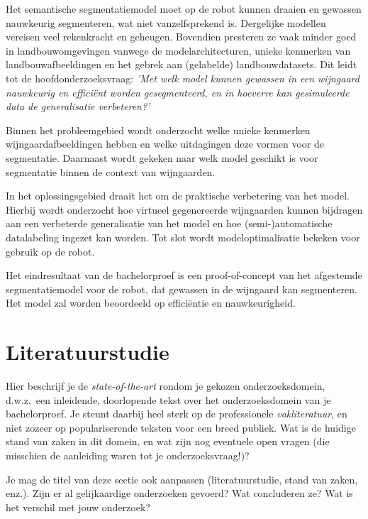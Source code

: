 Het semantische segmentatiemodel moet op de robot kunnen draaien en gewassen nauwkeurig segmenteren, wat niet vanzelfsprekend is. Dergelijke modellen vereisen veel rekenkracht en geheugen. Bovendien presteren ze vaak minder goed in landbouwomgevingen vanwege de modelarchitecturen, unieke kenmerken van landbouwafbeeldingen en het gebrek aan (gelabelde) landbouwdatasets. Dit leidt tot de hoofdonderzoeksvraag: \emph{'Met welk model kunnen gewassen in een wijngaard nauwkeurig en efficiënt worden gesegmenteerd, en in hoeverre kan gesimuleerde data de generalisatie verbeteren?'}

Binnen het probleemgebied wordt onderzocht welke unieke kenmerken wijngaardafbeeldingen hebben en welke uitdagingen deze vormen voor de segmentatie. Daarnaast wordt gekeken naar welk model geschikt is voor segmentatie binnen de context van wijngaarden.

In het oplossingsgebied draait het om de praktische verbetering van het model. Hierbij wordt onderzocht hoe virtueel gegenereerde wijngaarden kunnen bijdragen aan een verbeterde generalisatie van het model en hoe (semi-)automatische datalabeling ingezet kan worden.  Tot slot wordt modeloptimalisatie bekeken voor gebruik op de robot.

Het eindresultaat van de bachelorproef is een proof-of-concept van het afgestemde segmentatiemodel voor de robot, dat gewassen in de wijngaard kan segmenteren. Het model zal worden beoordeeld op efficiëntie en nauwkeurigheid.


\section{Literatuurstudie}%
\label{sec:literatuurstudie}

Hier beschrijf je de \emph{state-of-the-art} rondom je gekozen onderzoeksdomein, d.w.z.\ een inleidende, doorlopende tekst over het onderzoeksdomein van je bachelorproef. Je steunt daarbij heel sterk op de professionele \emph{vakliteratuur}, en niet zozeer op populariserende teksten voor een breed publiek. Wat is de huidige stand van zaken in dit domein, en wat zijn nog eventuele open vragen (die misschien de aanleiding waren tot je onderzoeksvraag!)?

Je mag de titel van deze sectie ook aanpassen (literatuurstudie, stand van zaken, enz.). Zijn er al gelijkaardige onderzoeken gevoerd? Wat concluderen ze? Wat is het verschil met jouw onderzoek?

